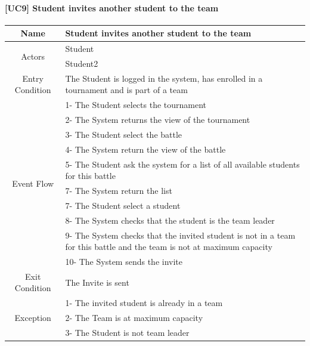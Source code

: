\documentclass{article}
\begin{document}
\paragraph{[UC9] Student invites another student to the team}
\begin{center}
\begin{tabular}{|c|m{40em}|}
\hline
Name & Student invites another student to the team\\
\hline
\multirow{2}{4em}{Actors}
& Student\\
& Student2\\
\hline
Entry Condition & The Student is logged in the system, has enrolled in a tournament and is part of a team\\
\hline
\multirow{10}{4em}{Event Flow}
& 1- The Student selects the tournament\\
& 2- The System returns the view of the tournament\\
& 3- The Student select the battle\\
& 4- The System return the view of the battle\\
& 5- The Student ask the system for a list of all available students for this battle\\\
& 7- The System return the list\\
& 7- The Student select a student\\
& 8- The System checks that the student is the team leader\\
& 9- The System checks that the invited student is not in a team for this battle and the team is not at maximum capacity\\
& 10- The System sends the invite\\
\hline
Exit Condition & The Invite is sent\\
\hline
\multirow{3}{4em}{Exception}
& 1- The invited student is already in a team\\
& 2- The Team is at maximum capacity\\
& 3- The Student is not team leader\\
\hline
\end{tabular}
\end{center}
\end{document}
